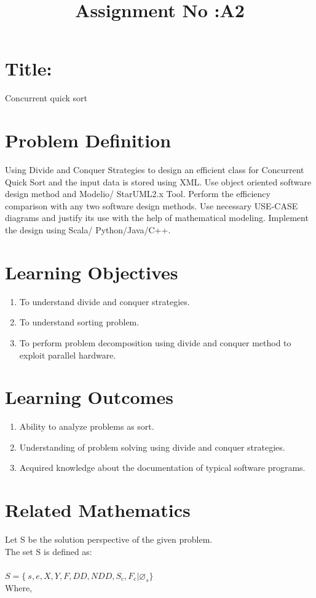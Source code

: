\documentclass[10pt,a4paper]{article}
\title{Assignment No :A2}
\date{}
\begin{document}
\maketitle
\section{Title:}
Concurrent quick sort

\section{Problem Definition}
Using Divide and Conquer Strategies to design an efficient class for Concurrent Quick Sort and the input data is stored using XML. Use object oriented software design method and Modelio/ StarUML2.x Tool.
Perform the efficiency comparison with any two software design methods. Use necessary USE-CASE
diagrams and justify its use with the help of mathematical modeling. Implement the design using Scala/
Python/Java/C++.

\section{Learning Objectives}
\begin{enumerate}
\item To understand divide and conquer strategies.
\item To understand sorting problem.
\item To perform problem decomposition using divide and conquer method to exploit parallel hardware.
\end{enumerate}

\section{Learning Outcomes}
\begin{enumerate}
\item Ability to analyze problems as sort.
\item Understanding of problem solving using divide and conquer strategies.
\item Acquired knowledge about the documentation of typical software programs.
\end{enumerate}


\section{Related Mathematics}
Let S be the solution perspective of the given problem.\\
The set S is defined as:\\\\
$S=\lbrace\ s,e,X,Y,F,DD,NDD,S_{c},F_{c}|\varnothing_{s}\rbrace$ \\
Where,
\end{document}
